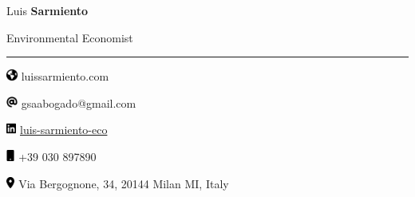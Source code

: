 \documentclass[
  10pt,
  letterpaper,
  DIV=11,
  numbers=noendperiod]{scrartcl}
\author{}
\date{}
\begin{document}
\ifdefined\Shaded\renewenvironment{Shaded}{\begin{tcolorbox}[breakable, boxrule=0pt, frame hidden, borderline west={3pt}{0pt}{shadecolor}, enhanced, interior hidden, sharp corners]}{\end{tcolorbox}}\fi

Luis \textbf{Sarmiento} \vspace{-0.15cm}

Environmental Economist

\vspace{-0.25cm}

\noindent 

\rule{5cm}{1pt}
\vspace{0.25cm}

\includegraphics[width=1em,height=1em]{cv_pdf_files/figure-pdf/fa-icon-f25e429b6e525c94655c4c1ea9a89fbd.pdf}
luissarmiento.com \vspace{-0.15cm}

\includegraphics[width=1em,height=1em]{cv_pdf_files/figure-pdf/fa-icon-0472185263d085cbc13489893c2b12dc.pdf}
gsaabogado@gmail.com \vspace{-0.15cm}

\includegraphics[width=0.88em,height=1em]{cv_pdf_files/figure-pdf/fa-icon-65ad8d20d25bdcf13492029ffb936540.pdf}
\href{https://www.linkedin.com/in/luis-sarmiento-eco}{luis-sarmiento-eco}
\vspace{-0.15cm}

\includegraphics[width=0.75em,height=1em]{cv_pdf_files/figure-pdf/fa-icon-007427b345eb0c895578b1173ef82880.pdf}
+39 030 897890 \vspace{-0.15cm}

\includegraphics[width=0.75em,height=1em]{cv_pdf_files/figure-pdf/fa-icon-73878e667d08a27804bf0774c72de1fb.pdf}
Via Bergognone, 34, 20144 Milan MI, Italy \vspace{-0.15cm}

\vspace{0.5 cm}
\end{document}
